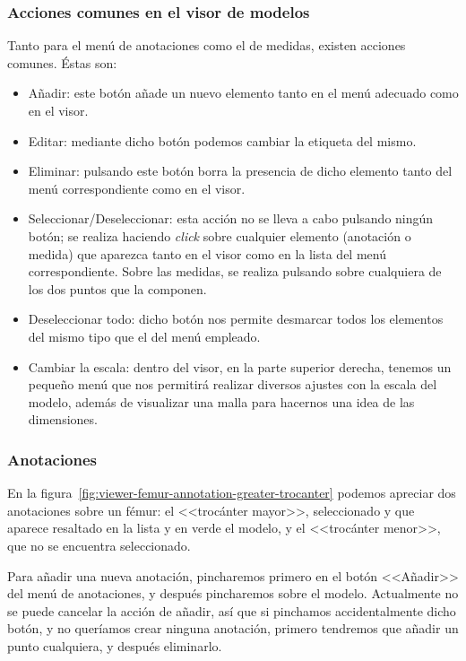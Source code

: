 \subsubsection{Acciones comunes en el visor de modelos}
Tanto para el menú de anotaciones como el de medidas, existen acciones comunes. Éstas son:
\begin{itemize}
	\item Añadir: este botón añade un nuevo elemento tanto en el menú adecuado como en el visor.
	\item Editar: mediante dicho botón podemos cambiar la etiqueta del mismo.
	\item Eliminar: pulsando este botón borra la presencia de dicho elemento tanto del menú correspondiente como en el visor.
	\item Seleccionar/Deseleccionar: esta acción no se lleva a cabo pulsando ningún botón; se realiza haciendo \textit{click} sobre cualquier elemento (anotación o medida) que aparezca tanto en el visor como en la lista del menú correspondiente. Sobre las medidas, se realiza pulsando sobre cualquiera de los dos puntos que la componen.
	\item Deseleccionar todo: dicho botón nos permite desmarcar todos los elementos del mismo tipo que el del menú empleado.
	\item Cambiar la escala: dentro del visor, en la parte superior derecha, tenemos un pequeño menú que nos permitirá realizar diversos ajustes con la escala del modelo, además de visualizar una malla para hacernos una idea de las dimensiones.
\end{itemize}

\subsubsection{Anotaciones}
En la figura~\ref{fig:viewer-femur-annotation-greater-trocanter} podemos apreciar dos anotaciones sobre un fémur: el <<trocánter mayor>>, seleccionado y que aparece resaltado en la lista y en verde el modelo, y el <<trocánter menor>>, que no se encuentra seleccionado.

Para añadir una nueva anotación, pincharemos primero en el botón <<Añadir>> del menú de anotaciones, y después pincharemos sobre el modelo. Actualmente no se puede cancelar la acción de añadir, así que si pinchamos accidentalmente dicho botón, y no queríamos crear ninguna anotación, primero tendremos que añadir un punto cualquiera, y después eliminarlo.

